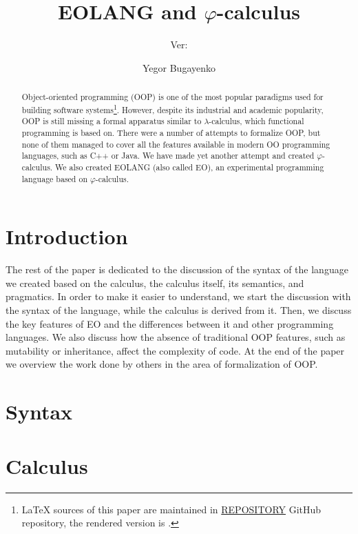 \documentclass[sigplan,nonacm,natbib=false]{acmart}
\title{EOLANG and \texorpdfstring{$\varphi$}{phi}-calculus}
\subtitle{%
  Ver:
  \texorpdfstring{
    \href{https://github.com/REPOSITORY/releases/tag/0.0.0}
      {\ff{0.0.0}}
  }{0.0.0}
}
\author{Yegor Bugayenko}
\affiliation{
  \institution{Huawei}
  \city{Moscow}
  \country{Russia}
}
\theoremstyle{theorems}
\newcommand\phic{$\varphi$-calculus}
\newcommand\eo{{\sffamily EO}}
\begin{document}
\begin{abstract}
Object-oriented programming (OOP) is one of the most popular
paradigms used for building software systems\footnote{%
  \LaTeX{} sources of this paper are maintained in
  \href{https://github.com/REPOSITORY}{REPOSITORY} GitHub repository,
  the rendered version is \href{https://github.com/REPOSITORY/releases/tag/0.0.0}{}.}.
However, despite
its industrial and academic popularity, OOP is still missing
a formal apparatus similar to $\lambda$-calculus, which functional
programming is based on. There were a number of attempts to formalize
OOP, but none of them managed to cover all the features available in
modern OO programming languages, such as C++ or Java.
We have made yet another attempt and created \phic{}. We also
created EOLANG (also called \eo{}), an experimental
programming language based on \phic{}.
\end{abstract}

\maketitle

\section{Introduction}
\label{sec:intro}



The rest of the paper is dedicated to the discussion of the
syntax of the language we created based on the calculus,
the calculus itself, its semantics, and pragmatics.
In order to make it easier to understand, we start
the discussion with the syntax of the language, while the calculus
is derived from it. Then, we discuss the
key features of \eo{} and the differences between it and other
programming languages. We also discuss how the absence of traditional
OOP features, such as mutability or inheritance, affect the complexity of code.
At the end of the paper we overview the work done by others in the area of
formalization of OOP.

\section{Syntax}
\label{sec:syntax}


\section{Calculus}
\label{sec:calculus}

\end{document}
